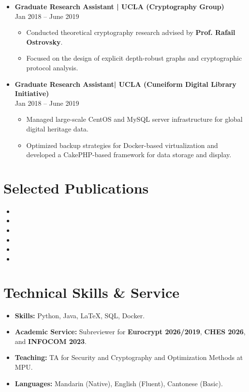 \documentclass[a4paper,12pt]{article}
\begin{document}
\begin{itemize}[left=0pt, label={}, itemsep=8pt]
    \item \textbf{Graduate Research Assistant | UCLA (Cryptography Group)} \\
    Jan 2018 -- June 2019
    \begin{itemize}[left=0pt,label=\textbullet,topsep=2pt]
        \item Conducted theoretical cryptography research advised by \textbf{Prof. Rafail Ostrovsky}.
        \item Focused on the design of explicit depth-robust graphs and cryptographic protocol analysis.
    \end{itemize}

    \item \textbf{Graduate Research Assistant| UCLA (Cuneiform Digital Library Initiative)} \\
    Jan 2018 -- June 2019
    \begin{itemize}[left=0pt,label=\textbullet,topsep=2pt]
        \item Managed large-scale CentOS and MySQL server infrastructure for global digital heritage data.
        \item Optimized backup strategies for Docker-based virtualization and developed a CakePHP-based framework for data storage and display.
    \end{itemize}
\end{itemize}

\section*{Selected Publications}
\begin{itemize}[left=0pt, label={}, itemsep=2pt]
    \item {}
    \item {}
    \item {}
    \item {}
    \item {}
    \item {}
\end{itemize}

\section*{Technical Skills \& Service}
\begin{itemize}[left=0pt, label={}]
    \item \textbf{Skills:} Python, Java, \LaTeX, SQL, Docker.
    \item \textbf{Academic Service:} Subreviewer for \textbf{Eurocrypt 2026/2019}, \textbf{CHES 2026}, and \textbf{INFOCOM 2023}.
    \item \textbf{Teaching:} TA for Security and Cryptography and Optimization Methods at MPU.
    \item \textbf{Languages:} Mandarin (Native), English (Fluent), Cantonese (Basic).
\end{itemize}
\end{document}
